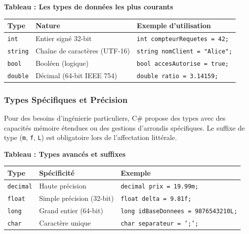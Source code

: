 \begin{center}
    \textbf{Tableau : Les types de données les plus courants} \\[0.3cm]
    \begin{tabular}{@{}llp{6cm}@{}}
        \toprule
        \textbf{Type} & \textbf{Nature} & \textbf{Exemple d'utilisation} \\
        \midrule
        \texttt{int} & Entier signé 32-bit & \texttt{int compteurRequetes = 42;} \\
        \texttt{string} & Chaîne de caractères (UTF-16) & \texttt{string nomClient = "Alice";} \\
        \texttt{bool} & Booléen (logique) & \texttt{bool accesAutorise = true;} \\
        \texttt{double} & Décimal (64-bit IEEE 754) & \texttt{double ratio = 3.14159;} \\
        \bottomrule
    \end{tabular}
\end{center}

\subsubsection{Types Spécifiques et Précision}

Pour des besoins d'ingénierie particuliers, C\# propose des types avec des capacités mémoire étendues ou des gestions d'arrondis spécifiques. Le suffixe de type (\texttt{m}, \texttt{f}, \texttt{L}) est obligatoire lors de l'affectation littérale.

\begin{center}
    \textbf{Tableau : Types avancés et suffixes} \\[0.3cm]
    \begin{tabular}{@{}llp{6cm}@{}}
        \toprule
        \textbf{Type} & \textbf{Spécificité} & \textbf{Exemple} \\
        \midrule
        \texttt{decimal} & Haute précision & \texttt{decimal prix = 19.99m;} \\
        \texttt{float} & Simple précision (32-bit) & \texttt{float delta = 9.81f;} \\
        \texttt{long} & Grand entier (64-bit) & \texttt{long idBaseDonnees = 9876543210L;} \\
        \texttt{char} & Caractère unique & \texttt{char separateur = ';';} \\
        \bottomrule
    \end{tabular}
\end{center}

